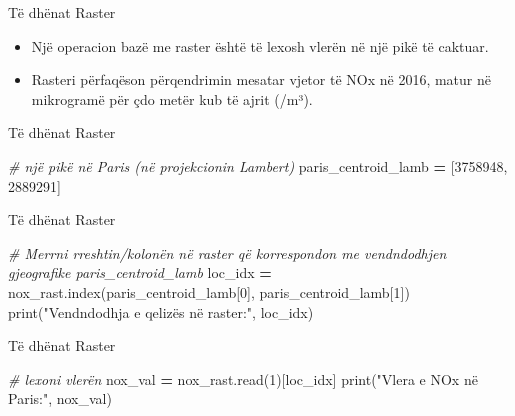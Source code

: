 \documentclass[
  ignorenonframetext,
]{beamer}
\newenvironment{Shaded}{\begin{snugshade}}{\end{snugshade}}
\newcommand{\BuiltInTok}[1]{#1}
\newcommand{\CommentTok}[1]{\textcolor[rgb]{0.56,0.35,0.01}{\textit{#1}}}
\newcommand{\DecValTok}[1]{\textcolor[rgb]{0.00,0.00,0.81}{#1}}
\newcommand{\NormalTok}[1]{#1}
\newcommand{\OperatorTok}[1]{\textcolor[rgb]{0.81,0.36,0.00}{\textbf{#1}}}
\newcommand{\StringTok}[1]{\textcolor[rgb]{0.31,0.60,0.02}{#1}}
\begin{document}
\begin{frame}{Të dhënat Raster}
\protect\hypertarget{tuxeb-dhuxebnat-raster-8}{}
\begin{itemize}
\item
  Një operacion bazë me raster është të lexosh vlerën në një pikë të
  caktuar.
\item
  Rasteri përfaqëson përqendrimin mesatar vjetor të NOx në 2016, matur
  në mikrogramë për çdo metër kub të ajrit (/m³).
\end{itemize}
\end{frame}

\begin{frame}[fragile]{Të dhënat Raster}
\protect\hypertarget{tuxeb-dhuxebnat-raster-9}{}

\begin{Shaded}
\begin{Highlighting}[]
\CommentTok{\# një pikë në Paris (në projekcionin Lambert)}
\NormalTok{paris\_centroid\_lamb }\OperatorTok{=}\NormalTok{ [}\DecValTok{3758948}\NormalTok{, }\DecValTok{2889291}\NormalTok{]}
\end{Highlighting}
\end{Shaded}
\end{frame}

\begin{frame}[fragile]{Të dhënat Raster}
\protect\hypertarget{tuxeb-dhuxebnat-raster-10}{}

\begin{Shaded}
\begin{Highlighting}[]
\CommentTok{\# Merrni rreshtin/kolonën në raster që korrespondon me vendndodhjen gjeografike paris\_centroid\_lamb}
\NormalTok{loc\_idx }\OperatorTok{=}\NormalTok{ nox\_rast.index(paris\_centroid\_lamb[}\DecValTok{0}\NormalTok{], paris\_centroid\_lamb[}\DecValTok{1}\NormalTok{])}
\BuiltInTok{print}\NormalTok{(}\StringTok{"Vendndodhja e qelizës në raster:"}\NormalTok{, loc\_idx)}
\end{Highlighting}
\end{Shaded}
\end{frame}

\begin{frame}[fragile]{Të dhënat Raster}
\protect\hypertarget{tuxeb-dhuxebnat-raster-11}{}

\begin{Shaded}
\begin{Highlighting}[]
\CommentTok{\# lexoni vlerën}
\NormalTok{nox\_val }\OperatorTok{=}\NormalTok{ nox\_rast.read(}\DecValTok{1}\NormalTok{)[loc\_idx]}
\BuiltInTok{print}\NormalTok{(}\StringTok{"Vlera e NOx në Paris:"}\NormalTok{, nox\_val)}
\end{Highlighting}
\end{Shaded}
\end{frame}
\end{document}
